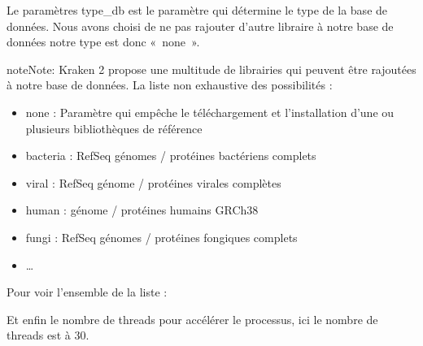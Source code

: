 \documentclass[letterpaper,10pt,french]{sphinxmanual}
\begin{document}
Le paramètres \sphinxhyphen{}type\_db est le paramètre qui détermine le type de la base de données. Nous avons choisi de ne pas rajouter d’autre libraire à notre base de données notre type est donc « none ».

\begin{sphinxadmonition}{note}{Note:}
Kraken 2 propose une multitude de librairies qui peuvent être rajoutées à notre base de données. La liste non exhaustive des possibilités :
\begin{itemize}
\item {} 
none : Paramètre qui empêche le téléchargement et l’installation d’une ou plusieurs bibliothèques de référence

\item {} 
bacteria : RefSeq génomes / protéines bactériens complets

\item {} 
viral : RefSeq génome / protéines virales complètes

\item {} 
human : génome / protéines humains GRCh38

\item {} 
fungi : RefSeq génomes / protéines fongiques complets

\item {} 
…

\end{itemize}
\end{sphinxadmonition}




Pour voir l’ensemble de la liste : 



Et enfin le nombre de threads pour accélérer le processus, ici le nombre de threads est à 30.
\end{document}
